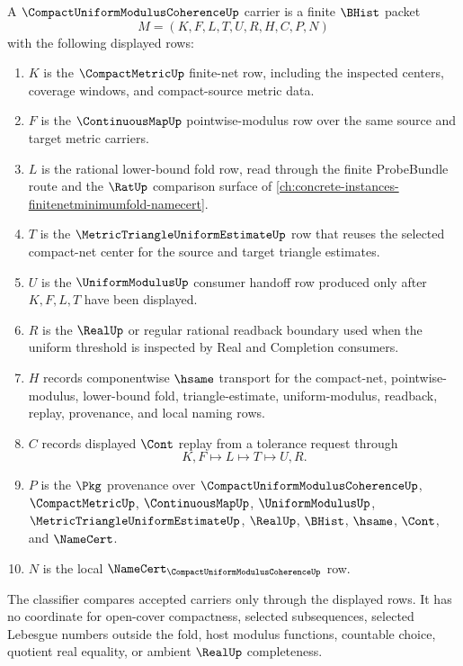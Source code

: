 \begin{definition}
\label{def:compact-uniform-modulus-coherence-carrier}
A $\CompactUniformModulusCoherenceUp$ carrier is a finite $\BHist$ packet
$$
M=(K,F,L,T,U,R,H,C,P,N)
$$
with the following displayed rows:
\begin{enumerate}
\item $K$ is the $\CompactMetricUp$ finite-net row, including the inspected centers, coverage windows, and compact-source metric data.
\item $F$ is the $\ContinuousMapUp$ pointwise-modulus row over the same source and target metric carriers.
\item $L$ is the rational lower-bound fold row, read through the finite ProbeBundle route and the $\RatUp$ comparison surface of \autoref{ch:concrete-instances-finitenetminimumfold-namecert}.
\item $T$ is the $\MetricTriangleUniformEstimateUp$ row that reuses the selected compact-net center for the source and target triangle estimates.
\item $U$ is the $\UniformModulusUp$ consumer handoff row produced only after $K,F,L,T$ have been displayed.
\item $R$ is the $\RealUp$ or regular rational readback boundary used when the uniform threshold is inspected by Real and Completion consumers.
\item $H$ records componentwise $\hsame$ transport for the compact-net, pointwise-modulus, lower-bound fold, triangle-estimate, uniform-modulus, readback, replay, provenance, and local naming rows.
\item $C$ records displayed $\Cont$ replay from a tolerance request through
$$
K,F \longmapsto L \longmapsto T \longmapsto U,R .
$$
\item $P$ is the $\Pkg$ provenance over $\CompactUniformModulusCoherenceUp$, $\CompactMetricUp$, $\ContinuousMapUp$, $\UniformModulusUp$, $\MetricTriangleUniformEstimateUp$, $\RealUp$, $\BHist$, $\hsame$, $\Cont$, and $\NameCert$.
\item $N$ is the local $\NameCert_{\CompactUniformModulusCoherenceUp}$ row.
\end{enumerate}
The classifier compares accepted carriers only through the displayed rows. It has no coordinate for open-cover compactness, selected subsequences, selected Lebesgue numbers outside the fold, host modulus functions, countable choice, quotient real equality, or ambient $\RealUp$ completeness.
\end{definition}

